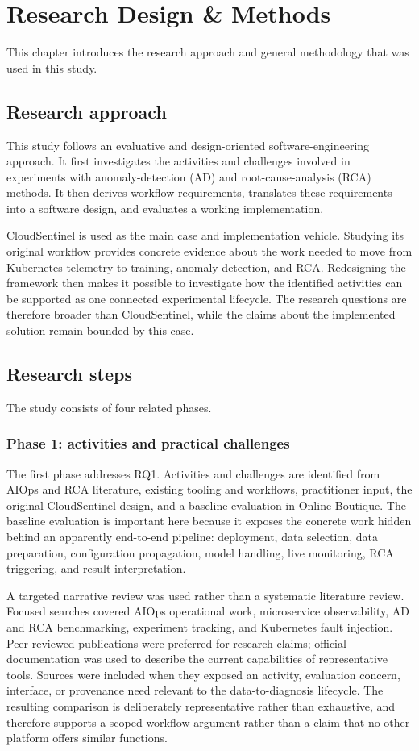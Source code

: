\chapter{Research Design \& Methods}%
\label{ch:methods}
This chapter introduces the research approach and general methodology that was used in this study.

\section{Research approach}
This study follows an evaluative and design-oriented software-engineering approach. It first investigates the activities and challenges involved in experiments with anomaly-detection (AD) and root-cause-analysis (RCA) methods. It then derives workflow requirements, translates these requirements into a software design, and evaluates a working implementation.

CloudSentinel is used as the main case and implementation vehicle. Studying its original workflow provides concrete evidence about the work needed to move from Kubernetes telemetry to training, anomaly detection, and RCA. Redesigning the framework then makes it possible to investigate how the identified activities can be supported as one connected experimental lifecycle. The research questions are therefore broader than CloudSentinel, while the claims about the implemented solution remain bounded by this case.

\section{Research steps}
The study consists of four related phases.

\subsection{Phase 1: activities and practical challenges}

The first phase addresses RQ1. Activities and challenges are identified from AIOps and RCA literature, existing tooling and workflows, practitioner input, the original CloudSentinel design, and a baseline evaluation in Online Boutique. The baseline evaluation is important here because it exposes the concrete work hidden behind an apparently end-to-end pipeline: deployment, data selection, data preparation, configuration propagation, model handling, live monitoring, RCA triggering, and result interpretation.

A targeted narrative review was used rather than a systematic literature review. Focused searches covered AIOps operational work, microservice observability, AD and RCA benchmarking, experiment tracking, and Kubernetes fault injection. Peer-reviewed publications were preferred for research claims; official documentation was used to describe the current capabilities of representative tools. Sources were included when they exposed an activity, evaluation concern, interface, or provenance need relevant to the data-to-diagnosis lifecycle. The resulting comparison is deliberately representative rather than exhaustive, and therefore supports a scoped workflow argument rather than a claim that no other platform offers similar functions.

